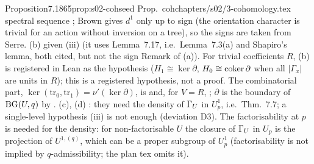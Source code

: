 \begin{quoted}{Proposition}{7.18}{65}{prop:s02-coh}{seed Prop.~coh}{chapters/s02/3-cohomology.tex}
spectral sequence \cite[VII.7, (7.10), p.~174 ($E^1$); VII.8, p.~175ff.\ ($d^1$)]{Br}; Brown gives $d^1$ only up to sign (the orientation character is trivial for an action without inversion on a tree), so the signs are taken from Serre. (b) \stpmc{} given (iii) (it uses Lemma~7.17,
i.e.\ Lemma~7.3(a) and Shapiro's lemma, both cited, but not the sign Remark of (a)). For trivial coefficients $R$,
(b) is registered in Lean as the hypothesis  ($H_1\cong\ker\partial$, $H_0\cong\operatorname{coker}\partial$ when all
$|\Gamma_x|$ are units in $R$); this is a registered hypothesis, not a proof.
The combinatorial part, $\ker(\mathrm{tr}_0,\mathrm{tr}_1)=\nu'(\ker\partial)$, is \stproved{} and, for $V=R$, \stformal{}
; $\partial$ is the boundary of $\mathrm{BG}(U,q)$ by
. (c), (d) \stpmc{}: they need the density of $\Gamma_U$ in
$U^1_p$, i.e.\ Thm.~7.7; a single-level hypothesis (iii) is not enough (deviation D3). The factorisability at $p$ is needed
for the density: for non-factorisable $U$ the closure of $\Gamma_U$ in $U_p$ is the projection of $U^{1,(q)}$, which can be a proper subgroup of $U^1_p$
(factorisability is not implied by $q$-admissibility; the plan tex omits it).
\end{quoted}
